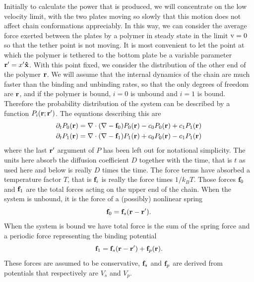 \documentclass[11pt]{ucthesis}
\def\br{{\bf r}}
\def\bof{{\bf f}}
\def\xhat{{\bf\hat x}}
\begin{document}
Initially to calculate the power that is produced, we will concentrate on the low velocity
limit, with the two plates moving so slowly that this motion does not affect
chain conformations appreciably. In this way, we can consider the average force
exerted between the plates by a polymer in steady state in the limit  ${\rm v}=0$ so that the
tether point is not moving. It is most convenient to let the point at which
the polymer is tethered to the bottom plate be a variable parameter $\br' = x' {\xhat}$.
With this point fixed, we consider the distribution of the other end of the
polymer $\br$.  We will assume that the internal dynamics of the chain
are much faster than the binding and unbinding rates, so that the only degrees
of freedom are $\br$, and if the polymer is bound, $i=0$ is unbound and $i=1$ is bound. Therefore the
probability distribution of the system can be described by a function
$P_i(\br;\br')$. The equations describing this are~\cite{ProstPRL}
\begin{subequations}
\label{eq:FP}
\begin{align}
\partial_t P_0(\br) = \nabla \cdot (\nabla - \bof_0)P_0(\br) - c_0 P_0(\br) + c_1 P_1(\br)\label{eq:FP0}\\
\partial_t P_1(\br) = \nabla \cdot (\nabla - \bof_1)P_1(\br) + c_0 P_0(\br) - c_1 P_1(\br)\label{eq:FP1}
\end{align}
\end{subequations}
where the last $\br'$ argument of $P$ has been left out for notational simplicity.
The units here absorb the diffusion coefficient $D$ together with the time, that
is $t$ as used here and below is really $D$ times the time. The force terms have 
absorbed a temperature factor $T$, that is $\bof_i$ is really the
force times $1/k_B T$.
Those forces $\bof_0$ and $\bof_1$ are the total forces acting on the upper end
of the chain. When the system is unbound, it is the force of a (possibly) nonlinear
spring 
\begin{equation}
\label{eq:unboundF}
\bof_0 = \bof_s(\br-\br'). 
\end{equation}
When the system is bound we have total force
is the sum of the spring force and a periodic force representing the binding
potential 
\begin{equation}
\label{eq:boundF}
\bof_1= \bof_s(\br-\br') + \bof_p(\br).
\end{equation}
These forces are assumed to be conservative, $\bof_s$ and $\bof_p$ are
derived from potentials that respectively are $V_s$ and $V_p$.
\end{document}
